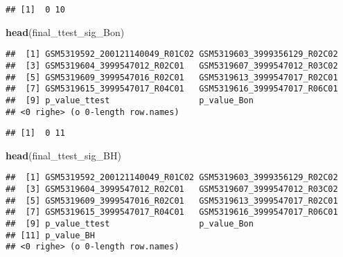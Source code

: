 \documentclass[
]{article}
\newenvironment{Shaded}{\begin{snugshade}}{\end{snugshade}}
\newcommand{\AttributeTok}[1]{\textcolor[rgb]{0.13,0.29,0.53}{#1}}
\newcommand{\CommentTok}[1]{\textcolor[rgb]{0.56,0.35,0.01}{\textit{#1}}}
\newcommand{\FloatTok}[1]{\textcolor[rgb]{0.00,0.00,0.81}{#1}}
\newcommand{\FunctionTok}[1]{\textcolor[rgb]{0.13,0.29,0.53}{\textbf{#1}}}
\newcommand{\NormalTok}[1]{#1}
\newcommand{\OtherTok}[1]{\textcolor[rgb]{0.56,0.35,0.01}{#1}}
\newcommand{\SpecialCharTok}[1]{\textcolor[rgb]{0.81,0.36,0.00}{\textbf{#1}}}
\newcommand{\StringTok}[1]{\textcolor[rgb]{0.31,0.60,0.02}{#1}}
\begin{document}
\begin{verbatim}
## [1]  0 10
\end{verbatim}

\begin{Shaded}
\begin{Highlighting}[]
\FunctionTok{head}\NormalTok{(final\_ttest\_sig\_Bon)}
\end{Highlighting}
\end{Shaded}

\begin{verbatim}
##  [1] GSM5319592_200121140049_R01C02 GSM5319603_3999356129_R02C02  
##  [3] GSM5319604_3999547012_R02C01   GSM5319607_3999547012_R03C02  
##  [5] GSM5319609_3999547016_R02C01   GSM5319613_3999547017_R02C01  
##  [7] GSM5319615_3999547017_R04C01   GSM5319616_3999547017_R06C01  
##  [9] p_value_ttest                  p_value_Bon                   
## <0 righe> (o 0-length row.names)
\end{verbatim}

\begin{Shaded}
\end{Shaded}

\begin{verbatim}
## [1]  0 11
\end{verbatim}

\begin{Shaded}
\begin{Highlighting}[]
\FunctionTok{head}\NormalTok{(final\_ttest\_sig\_BH)}
\end{Highlighting}
\end{Shaded}

\begin{verbatim}
##  [1] GSM5319592_200121140049_R01C02 GSM5319603_3999356129_R02C02  
##  [3] GSM5319604_3999547012_R02C01   GSM5319607_3999547012_R03C02  
##  [5] GSM5319609_3999547016_R02C01   GSM5319613_3999547017_R02C01  
##  [7] GSM5319615_3999547017_R04C01   GSM5319616_3999547017_R06C01  
##  [9] p_value_ttest                  p_value_Bon                   
## [11] p_value_BH                    
## <0 righe> (o 0-length row.names)
\end{verbatim}
\end{document}
